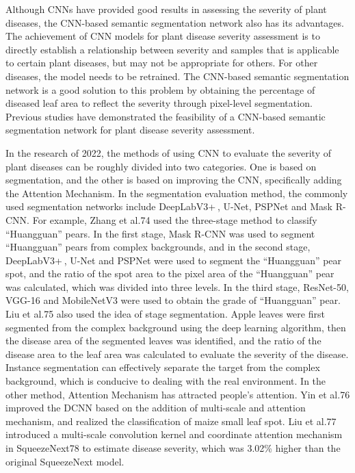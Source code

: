 Although CNNs have provided good results in assessing the severity of plant diseases, the CNN-based semantic segmentation network also has its advantages. The achievement of CNN models for plant disease severity assessment is to directly establish a relationship between severity and samples that is applicable to certain plant diseases, but may not be appropriate for others. For other diseases, the model needs to be retrained. The CNN-based semantic segmentation network is a good solution to this problem by obtaining the percentage of diseased leaf area to reflect the severity through pixel-level segmentation. Previous studies have demonstrated the feasibility of a CNN-based semantic segmentation network for plant disease severity assessment.

In the research of 2022, the methods of using CNN to evaluate the severity of plant diseases can be roughly divided into two categories. One is based on segmentation, and the other is based on improving the CNN, specifically adding the Attention Mechanism. In the segmentation evaluation method, the commonly used segmentation networks include DeepLabV3+ , U-Net, PSPNet and Mask R-CNN. For example, Zhang et al.74 used the three-stage method to classify “Huangguan” pears. In the first stage, Mask R-CNN was used to segment “Huangguan” pears from complex backgrounds, and in the second stage, DeepLabV3+ , U-Net and PSPNet were used to segment the “Huangguan” pear spot, and the ratio of the spot area to the pixel area of the “Huangguan” pear was calculated, which was divided into three levels. In the third stage, ResNet-50, VGG-16 and MobileNetV3 were used to obtain the grade of “Huangguan” pear. Liu et al.75 also used the idea of stage segmentation. Apple leaves were first segmented from the complex background using the deep learning algorithm, then the disease area of the segmented leaves was identified, and the ratio of the disease area to the leaf area was calculated to evaluate the severity of the disease. Instance segmentation can effectively separate the target from the complex background, which is conducive to dealing with the real environment. In the other method, Attention Mechanism has attracted people's attention. Yin et al.76 improved the DCNN based on the addition of multi-scale and attention mechanism, and realized the classification of maize small leaf spot. Liu et al.77 introduced a multi-scale convolution kernel and coordinate attention mechanism in SqueezeNext78 to estimate disease severity, which was 3.02\% higher than the original SqueezeNext model.

